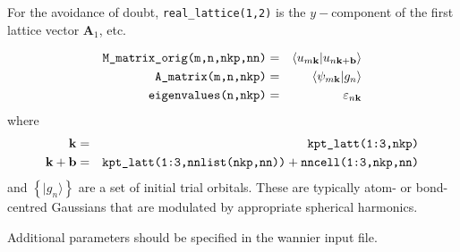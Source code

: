For the avoidance of doubt, \verb#real_lattice(1,2)# is the
$y-$component of the first lattice 
vector $\mathbf{A}_{1}$, etc.

\begin{eqnarray*}
\verb#M_matrix_orig(m,n,nkp,nn)# & = & \left\langle u_{m\mathbf{k}} |
u_{n\mathbf{k+b}}\right\rangle\\
\verb#A_matrix(m,n,nkp)# & = &
\left\langle \psi_{m\mathbf{k}}|g_{n}\right\rangle\\
\verb#eigenvalues(n,nkp)# &=& \varepsilon_{n\mathbf{k}}
\end{eqnarray*}
where
\begin{eqnarray*}
\mathbf{k} &=&\verb#kpt_latt(1:3,nkp)#\\
\mathbf{k+b}&=& \verb#kpt_latt(1:3,nnlist(nkp,nn))# +
\verb#nncell(1:3,nkp,nn)# 
\end{eqnarray*}
and
$\left\{|g_{n}\rangle\right\}$ are a set of initial trial
orbitals. These are
typically atom- or bond-centred Gaussians that are modulated by
appropriate spherical harmonics. 

Additional parameters should be specified in the wannier input
file.

